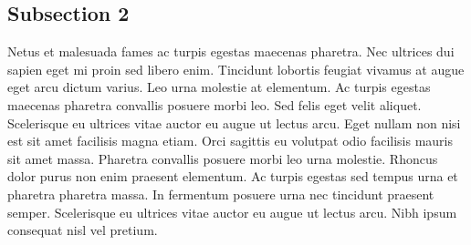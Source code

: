 \subsection{Subsection 2}


Netus et malesuada fames ac turpis egestas maecenas pharetra. Nec ultrices dui sapien eget mi proin sed libero enim. Tincidunt lobortis feugiat vivamus at augue eget arcu dictum varius. Leo urna molestie at elementum. Ac turpis egestas maecenas pharetra convallis posuere morbi leo. Sed felis eget velit aliquet. Scelerisque eu ultrices vitae auctor eu augue ut lectus arcu. Eget nullam non nisi est sit amet facilisis magna etiam. Orci sagittis eu volutpat odio facilisis mauris sit amet massa. Pharetra convallis posuere morbi leo urna molestie. Rhoncus dolor purus non enim praesent elementum. Ac turpis egestas sed tempus urna et pharetra pharetra massa. In fermentum posuere urna nec tincidunt praesent semper. Scelerisque eu ultrices vitae auctor eu augue ut lectus arcu. Nibh ipsum consequat nisl vel pretium.